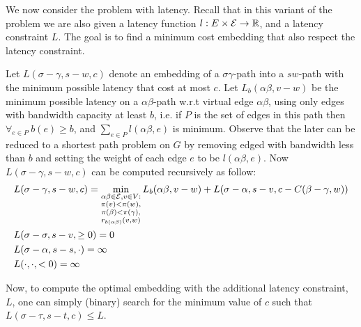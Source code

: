 We now consider the \VPN{} problem with latency.
Recall that in this variant of the problem we are also given a latency function
$l : E \times \mathcal{E} \to \mathbb{R}$, and a latency constraint $L$.
The goal is to find a minimum cost embedding that also respect the latency
constraint.

Let $L(\sigma-\gamma, s-w, c)$ denote an embedding of a $\sigma\gamma$-path
into a $sw$-path with the minimum possible latency that cost at most $c$.
Let $L_{b}(\alpha\beta, v-w)$ be the minimum possible latency on a $\alpha\beta$-path
w.r.t virtual edge $\alpha\beta$, using only edges with bandwidth capacity at least $b$,
i.e. if $P$ is the set of edges in this path then $\forall_{e \in P}~b(e) \geq b$,
and $\sum_{e \in P}l(\alpha\beta, e)$ is minimum.
Observe that the later can be reduced to a shortest path problem on $G$ by removing
edged with bandwidth less than $b$ and setting the weight of each edge $e$ to be 
$l(\alpha\beta, e)$.
Now $L(\sigma-\gamma, s-w, c)$ can be computed recursively as follow:
\begin{align*}
&L(\sigma-\gamma, s-w, c) = 
\min_{\substack{
\alpha\beta \in \mathcal{E},  
v \in V:
\\
\pi(v) < \pi(w),
\\
\pi(\beta ) < \pi(\gamma ), 
\\
r_{b(\alpha\beta)}(v,w)
}}
L_{b}(\alpha\beta, v-w) + 
L(\sigma-\alpha, s-v, c - C(\beta-\gamma, w))
\\
&L(\sigma-\sigma, s-v, \geq 0) = 0
\\
&L(\sigma-\alpha, s-s, \cdot) = \infty
\\
&L(\cdot, \cdot, <0) = \infty
\end{align*} 

Now, to compute the optimal embedding with the additional latency constraint,
$L$, one can simply (binary) search for the minimum value of $c$ such that
$L(\sigma-\tau, s-t, c) \leq L$.
